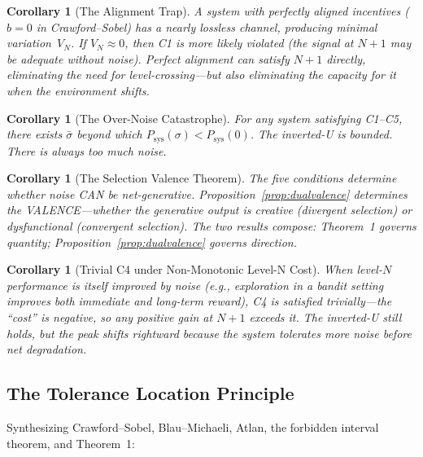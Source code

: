 \documentclass[12pt,letterpaper]{article}
\newtheorem{corollary}[theorem]{Corollary}
\theoremstyle{definition}
\theoremstyle{remark}
\newcommand{\Psys}{P_{\text{sys}}}
\begin{document}
\begin{corollary}[The Alignment Trap]
A system with perfectly aligned incentives ($b = 0$ in Crawford--Sobel) has a nearly lossless channel, producing minimal variation~$V_N$. If $V_N \approx 0$, then C1 is more likely violated (the signal at $N{+}1$ may be adequate without noise). Perfect alignment can satisfy $N{+}1$ directly, eliminating the need for level-crossing---but also eliminating the capacity for it when the environment shifts.
\end{corollary}

\begin{corollary}[The Over-Noise Catastrophe]
\label{cor:overnoise}
For any system satisfying C1--C5, there exists $\bar{\sigma}$ beyond which $\Psys(\sigma) < \Psys(0)$. The inverted-U is bounded. There is always too much noise.
\end{corollary}

\begin{corollary}[The Selection Valence Theorem]
The five conditions determine whether noise CAN be net-generative. Proposition~\ref{prop:dualvalence} determines the VALENCE---whether the generative output is creative (divergent selection) or dysfunctional (convergent selection). The two results compose: Theorem~1 governs quantity; Proposition~\ref{prop:dualvalence} governs direction.
\end{corollary}

\begin{corollary}[Trivial C4 under Non-Monotonic Level-N Cost]
\label{cor:trivialC4}
When level-$N$ performance is itself improved by noise (e.g., exploration in a bandit setting improves both immediate and long-term reward), C4 is satisfied trivially---the ``cost'' is negative, so any positive gain at $N{+}1$ exceeds it. The inverted-U still holds, but the peak shifts rightward because the system tolerates more noise before net degradation.
\end{corollary}


\subsection{The Tolerance Location Principle}

Synthesizing Crawford--Sobel, Blau--Michaeli, Atlan, the forbidden interval theorem, and Theorem~1:
\end{document}
